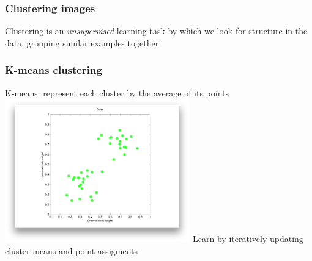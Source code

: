 \begin{frame}
  \frametitle{Clustering images}

  \begin{center}
    Clustering is an \textit{unsupervised} learning task by which we
    look for structure in the data, grouping similar examples together
    \vskip20pt
    \vskip20pt
  \end{center}

\end{frame}


\begin{frame}
  \frametitle{K-means clustering}

  \begin{center}
    K-means: represent each cluster by the average of its points 
    \vskip20pt
    \includegraphics[width=0.6\textwidth]{em_animation_1.png}
    \vskip20pt
    Learn by iteratively updating cluster means and point assigments
  \end{center}
\end{frame}

